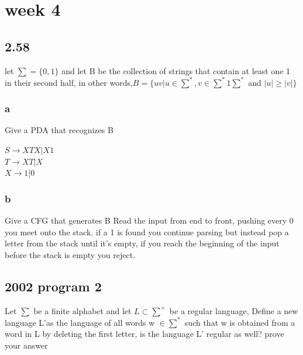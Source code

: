 \documentclass[a4paper,10pt,titlepage]{report}
\begin{document}
\section{week 4}

\subsection{2.58}

let $\sum = \{0,1\}$ and let B be the collection of strings that contain at least one 1 in their second half, in other words,$ B = \{uv | u \in \sum ^*, v \in \sum^* 1 \sum^*$ and $ |u| \geq |v|\}$
\\
\subsubsection{a}
 Give a PDA that recognizes B
 
$ S \rightarrow XTX | X1$ \\
$ T \rightarrow XT | X $ \\
$ X \rightarrow 1|0$ \\
 
 
 \subsubsection{b}
Give a CFG that generates B
Read the input from end to front, pushing every 0 you meet onto the stack. if a 1 is found you continue parsing but instead pop a letter from the stack until it's empty, if you reach the beginning of the input before the stack is empty you reject.

\subsection{2002 program 2}
Let $\sum$ be a finite alphabet and let $L \subset \sum^+ $ be a regular language, Define a new language L'as the language of all words w $\in \sum^*$ such that w is obtained from a word in L by deleting the first letter, is the language L' regular as well? prove your answer\\





\newpage

 
\end{document}
